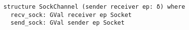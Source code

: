 \begin{lstlisting}[language=lean]
structure SockChannel (sender receiver ep: δ) where
  recv_sock: GVal receiver ep Socket
  send_sock: GVal sender ep Socket
\end{lstlisting}
